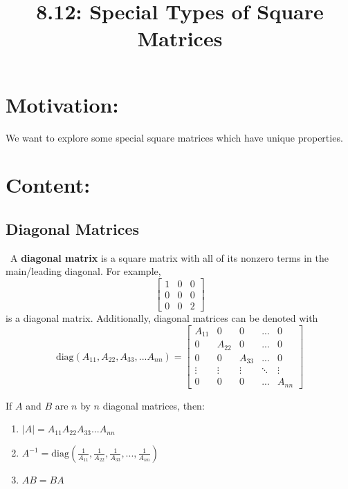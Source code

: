 \documentclass{article}
\title{8.12: Special Types of Square Matrices}
\begin{document}
\maketitle
\section{Motivation:}
We want to explore some special square matrices which have unique properties.

\section{Content:}
\subsection{Diagonal Matrices}

\begin{definition}
    \ 
A \textbf{diagonal matrix} is a square matrix with all of its nonzero terms in the main/leading diagonal. For example, $$\begin{bmatrix}
    1&0&0\\0&0&0\\0&0&2
\end{bmatrix}$$is a diagonal matrix. Additionally, diagonal matrices can be denoted with $$\text{diag}(A_{11}, A_{22}, A_{33}, ... A_{nn}) = \begin{bmatrix}
    A_{11}& 0 & 0 & ... & 0\\
    0 & A_{22} & 0 & ... & 0\\
    0 & 0 & A_{33} & ... & 0\\
    \vdots & \vdots & \vdots & \ddots & \vdots\\
    0 & 0 & 0 & ... & A_{nn}
\end{bmatrix}$$
\end{definition}

\begin{proposition}
If $A$ and $B$ are $n$ by $n$ diagonal matrices, then:
\begin{enumerate}
    \item $\vert A\vert = A_{11}A_{22}A_{33}...A_{nn}$
    \item $A ^{-1} = \text{diag}(\frac{1}{A_{11}}, \frac{1}{A_{22}}, \frac{1}{A_{33}},...,\frac{1}{A_{nn}})$
    \item $AB = BA$
\end{enumerate}
\end{proposition}
\end{document}
